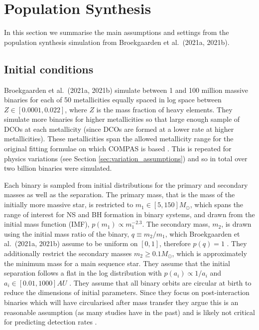 \section{Population Synthesis}\label{app:pop_synth}

In this section we summarise the main assumptions and settings from the population synthesis simulation from Broekgaarden et al.\ (2021a, 2021b).

\subsection{Initial conditions}

Broekgaarden et al.\ (2021a, 2021b) simulate between 1 and 100 million massive binaries for each of 50 metallicities equally spaced in log space between $Z \in [0.0001, 0.022]$, where $Z$ is the mass fraction of heavy elements. They simulate more binaries for higher metallicities so that large enough sample of DCOs at each metallicity (since DCOs are formed at a lower rate at higher metallicities). These metallicities span the allowed metallicity range for the original fitting formulae on which COMPAS is based \citep{Hurley+2000}. This is repeated for \nMinusOneModels{} physics variations (see Section \ref{sec:variation_assumptions}) and so in total over two billion binaries were simulated.

Each binary is sampled from initial distributions for the primary and secondary masses as well as the separation. The primary mass, that is the mass of the initially more massive star, is restricted to $m_1 \in [5, 150] \unit{M_{\odot}}$, which spans the range of interest for NS and BH formation in binary systems, and drawn from the \citet{Kroupa+2001} initial mass function (IMF), $p(m_1) \propto m_1^{-2.3}$. The secondary mass, $m_2$, is drawn using the initial mass ratio of the binary, $q \equiv m_2 / m_1$, which Broekgaarden et al.\ (2021a, 2021b) assume to be uniform on $[0, 1]$, therefore $p(q) = 1$ \citep[e.g.\ consistent with][]{Sana+2012}. They additionally restrict the secondary masses $m_2 \ge 0.1 \unit{M_{\odot}}$, which is approximately the minimum mass for a main sequence star. They assume that the initial separation follows a flat in the log distribution with $p(a_i) \propto 1 / a_i$ and $a_i \in [0.01, 1000] \unit{AU}$ \citep{Opik+1924, Abt+1983}. They assume that all binary orbits are circular at birth to reduce the dimensions of initial parameters. Since they focus on post-interaction binaries which will have circularised after mass transfer they argue this is an reasonable assumption (as many studies have in the past) and is likely not critical for predicting detection rates \citep{Hurley+2002, deMink+2015}.

